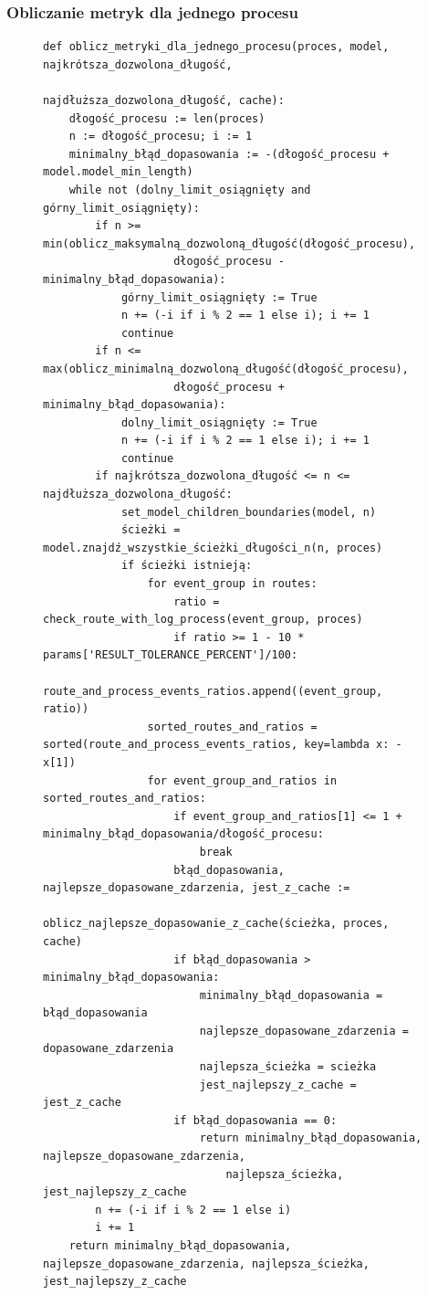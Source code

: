 \subsubsection{Obliczanie metryk dla jednego procesu}
\clearpage
\begin{figure}[!ht]
\lstset{caption=Obliczanie metryk dla jednego procesu, captionpos=b}
\lstset{label=src:best_result, frame=single}
\begin{lstlisting}
def oblicz_metryki_dla_jednego_procesu(proces, model, najkrótsza_dozwolona_długość, 
				               najdłuższa_dozwolona_długość, cache):
    dłogość_procesu := len(proces)
    n := dłogość_procesu; i := 1
    minimalny_błąd_dopasowania := -(dłogość_procesu + model.model_min_length)
	while not (dolny_limit_osiągnięty and górny_limit_osiągnięty):
        if n >= min(oblicz_maksymalną_dozwoloną_długość(dłogość_procesu), 
                    dłogość_procesu - minimalny_błąd_dopasowania):
            górny_limit_osiągnięty := True
            n += (-i if i % 2 == 1 else i); i += 1
            continue
        if n <= max(oblicz_minimalną_dozwoloną_długość(dłogość_procesu), 
                    dłogość_procesu + minimalny_błąd_dopasowania):
            dolny_limit_osiągnięty := True
            n += (-i if i % 2 == 1 else i); i += 1
            continue
        if najkrótsza_dozwolona_długość <= n <= najdłuższa_dozwolona_długość:
            set_model_children_boundaries(model, n)
            ścieżki = model.znajdź_wszystkie_ścieżki_długości_n(n, proces)
            if ścieżki istnieją:
                for event_group in routes:
                    ratio = check_route_with_log_process(event_group, proces)
                    if ratio >= 1 - 10 * params['RESULT_TOLERANCE_PERCENT']/100:
                        route_and_process_events_ratios.append((event_group, ratio))
                sorted_routes_and_ratios = sorted(route_and_process_events_ratios, key=lambda x: -x[1])
                for event_group_and_ratios in sorted_routes_and_ratios:
                    if event_group_and_ratios[1] <= 1 + minimalny_błąd_dopasowania/dłogość_procesu:
                        break
                    błąd_dopasowania, najlepsze_dopasowane_zdarzenia, jest_z_cache :=
                        oblicz_najlepsze_dopasowanie_z_cache(ścieżka, proces, cache)
                    if błąd_dopasowania > minimalny_błąd_dopasowania:
                        minimalny_błąd_dopasowania = błąd_dopasowania
                        najlepsze_dopasowane_zdarzenia = dopasowane_zdarzenia
                        najlepsza_ścieżka = scieżka
                        jest_najlepszy_z_cache = jest_z_cache
                    if błąd_dopasowania == 0:
                        return minimalny_błąd_dopasowania, najlepsze_dopasowane_zdarzenia, 
                            najlepsza_ścieżka, jest_najlepszy_z_cache
        n += (-i if i % 2 == 1 else i)
        i += 1
    return minimalny_błąd_dopasowania, najlepsze_dopasowane_zdarzenia, najlepsza_ścieżka, jest_najlepszy_z_cache
\end{lstlisting}
\end{figure}

